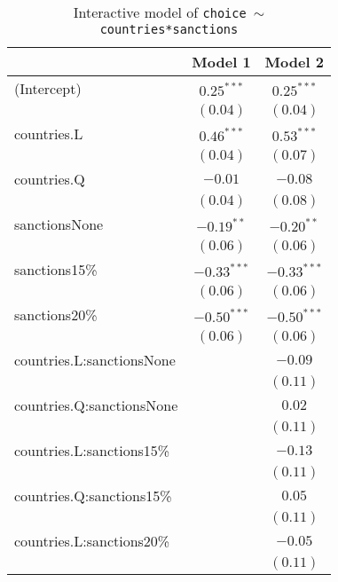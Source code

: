 \documentclass[12pt,letterpaper]{article}
\begin{document}
\begin{enumerate}
\begin{enumerate}
		\begin{table}[h!]
	\caption{Interactive model of \texttt{choice $\sim$ countries*sanctions}}
	\vspace{.25cm}
	\label{table:coefficients2}
	\centering
\begin{adjustbox}{width=.475\textwidth}
\begin{tabular}{l c c}
\hline
 & Model 1 & Model 2 \\
\hline
(Intercept)               & $0.25^{***}$  & $0.25^{***}$  \\
                          & $(0.04)$      & $(0.04)$      \\
countries.L               & $0.46^{***}$  & $0.53^{***}$  \\
                          & $(0.04)$      & $(0.07)$      \\
countries.Q               & $-0.01$       & $-0.08$       \\
                          & $(0.04)$      & $(0.08)$      \\
sanctionsNone             & $-0.19^{**}$  & $-0.20^{**}$  \\
                          & $(0.06)$      & $(0.06)$      \\
sanctions15\%             & $-0.33^{***}$ & $-0.33^{***}$ \\
                          & $(0.06)$      & $(0.06)$      \\
sanctions20\%             & $-0.50^{***}$ & $-0.50^{***}$ \\
                          & $(0.06)$      & $(0.06)$      \\
countries.L:sanctionsNone &               & $-0.09$       \\
                          &               & $(0.11)$      \\
countries.Q:sanctionsNone &               & $0.02$        \\
                          &               & $(0.11)$      \\
countries.L:sanctions15\% &               & $-0.13$       \\
                          &               & $(0.11)$      \\
countries.Q:sanctions15\% &               & $0.05$        \\
                          &               & $(0.11)$      \\
countries.L:sanctions20\% &               & $-0.05$       \\
                          &               & $(0.11)$      \\

\end{tabular}
\end{adjustbox}
\end{table}
\end{enumerate}
\end{enumerate}
\end{document}
